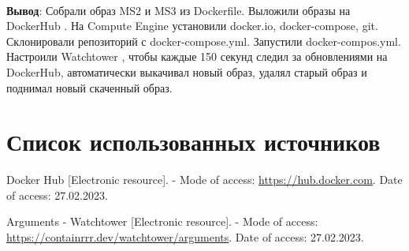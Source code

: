 \documentclass[12pt, a4paper, simple]{eskdtext}
\begin{document}
  \paragraph{} \textbf{Вывод}:
  Собрали образ MS2 и MS3 из Dockerfile.
  Выложили образы на DockerHub \cite{dockerhub}.
  На Compute Engine установили docker.io, docker-compose, git.
  Склонировали репозиторий с docker-compose.yml.
  Запустили docker-compos.yml.
  Настроили Watchtower \cite{watchtower}, чтобы каждые 150 секунд следил за обновлениями на DockerHub, автоматически выкачивал новый образ,
  удалял старый образ и поднимал новый скаченный образ.

  \begingroup
    \section*{Список использованных источников} %

    \renewcommand{\addcontentsline}[3]{}%
    \renewcommand{\section}[2]{}%

    \begin{thebibliography}{}

      Docker Hub
      [Electronic resource]. -
      Mode of access:
      \url{https://hub.docker.com}.
      {\scriptsize
      Date of access: 27.02.2023.
      }

      Arguments - Watchtower
      [Electronic resource]. -
      Mode of access:
      \url{https://containrrr.dev/watchtower/arguments}.
      Date of access: 27.02.2023.

    \end{thebibliography}
  \endgroup
\end{document}

